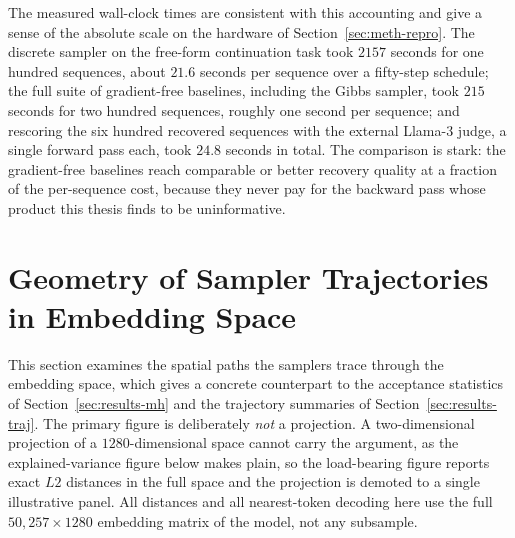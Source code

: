 The measured wall-clock times are consistent with this accounting and give a sense of the absolute scale on the hardware of Section~\ref{sec:meth-repro}. The discrete sampler on the free-form continuation task took $2157$ seconds for one hundred sequences, about $21.6$ seconds per sequence over a fifty-step schedule; the full suite of gradient-free baselines, including the Gibbs sampler, took $215$ seconds for two hundred sequences, roughly one second per sequence; and rescoring the six hundred recovered sequences with the external Llama-3 judge, a single forward pass each, took $24.8$ seconds in total.
The comparison is stark: the gradient-free baselines reach comparable or better recovery quality at a fraction of the per-sequence cost, because they never pay for the backward pass whose product this thesis finds to be uninformative.

\clearpage
\section{Geometry of Sampler Trajectories in Embedding Space}
\label{app:trajectory}

This section examines the spatial paths the samplers trace through the embedding space, which gives a concrete counterpart to the acceptance statistics of Section~\ref{sec:results-mh} and the trajectory summaries of Section~\ref{sec:results-traj}.
The primary figure is deliberately \emph{not} a projection. A two-dimensional projection of a $1280$-dimensional space cannot carry the argument, as the explained-variance figure below makes plain, so the load-bearing figure reports exact $L2$ distances in the full space and the projection is demoted to a single illustrative panel. All distances and all nearest-token decoding here use the full $50{,}257\times 1280$ embedding matrix of the model, not any subsample.

